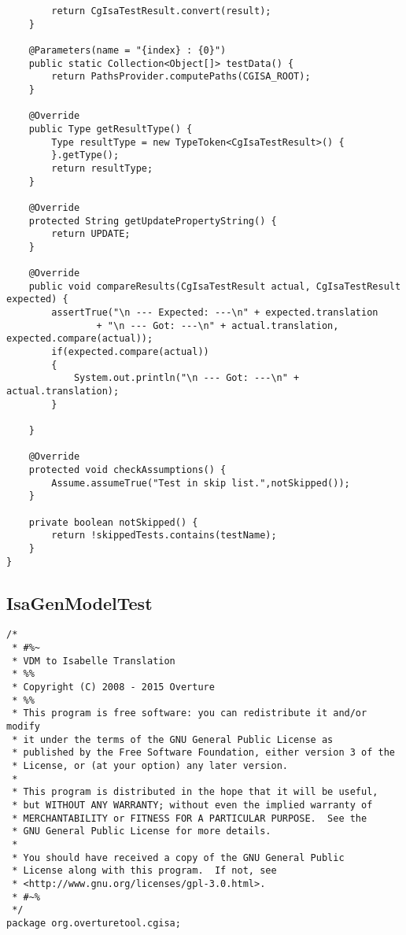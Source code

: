 \begin{appendices}
\begin{lstlisting}
        return CgIsaTestResult.convert(result);
    }

    @Parameters(name = "{index} : {0}")
    public static Collection<Object[]> testData() {
        return PathsProvider.computePaths(CGISA_ROOT);
    }

    @Override
    public Type getResultType() {
        Type resultType = new TypeToken<CgIsaTestResult>() {
        }.getType();
        return resultType;
    }

    @Override
    protected String getUpdatePropertyString() {
        return UPDATE;
    }

    @Override
    public void compareResults(CgIsaTestResult actual, CgIsaTestResult expected) {
        assertTrue("\n --- Expected: ---\n" + expected.translation
                + "\n --- Got: ---\n" + actual.translation, expected.compare(actual));
        if(expected.compare(actual))
        {
            System.out.println("\n --- Got: ---\n" + actual.translation);
        }

    }

    @Override
    protected void checkAssumptions() {
        Assume.assumeTrue("Test in skip list.",notSkipped());
    }

    private boolean notSkipped() {
        return !skippedTests.contains(testName);
    }
}

\end{lstlisting}

\subsection{IsaGenModelTest} \label{IsaGenModelTest}
\begin{lstlisting}
/*
 * #%~
 * VDM to Isabelle Translation
 * %%
 * Copyright (C) 2008 - 2015 Overture
 * %%
 * This program is free software: you can redistribute it and/or modify
 * it under the terms of the GNU General Public License as
 * published by the Free Software Foundation, either version 3 of the
 * License, or (at your option) any later version.
 * 
 * This program is distributed in the hope that it will be useful,
 * but WITHOUT ANY WARRANTY; without even the implied warranty of
 * MERCHANTABILITY or FITNESS FOR A PARTICULAR PURPOSE.  See the
 * GNU General Public License for more details.
 * 
 * You should have received a copy of the GNU General Public
 * License along with this program.  If not, see
 * <http://www.gnu.org/licenses/gpl-3.0.html>.
 * #~%
 */
package org.overturetool.cgisa;


\end{lstlisting}
\end{appendices}

